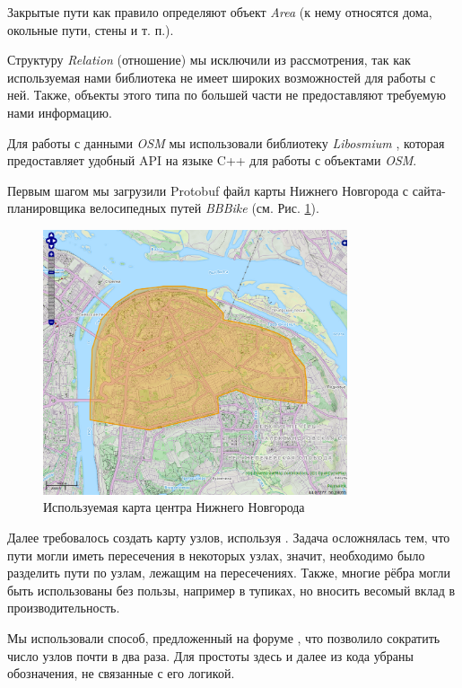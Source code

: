 \documentclass[11pt]{article}
\begin{document}
    	Закрытые пути как правило определяют объект \textit{Area} (к нему относятся дома, окольные пути, стены и т. п.).
    	
    	Структуру \textit{Relation} (отношение) мы исключили из рассмотрения, так как используемая нами библиотека не имеет широких возможностей для работы с ней.
    	Также, объекты этого типа по большей части не предоставляют требуемую нами информацию.
    
	Для работы с данными \textit{OSM} мы использовали библиотеку \textit{Libosmium} \cite{libosm}, которая предоставляет удобный API на языке C++ для работы с объектами \textit{OSM}.
	
	Первым шагом мы загрузили Protobuf файл карты Нижнего Новгорода с сайта-планировщика велосипедных путей \textit{BBBike} \cite{bbbike} (см. Рис. \ref{fig:bbbike}).

	\begin{figure}[ht]
	\centering	
	\includegraphics[width=0.8\textwidth]{pics/bbbike.png}
	\caption{Используемая карта центра Нижнего Новгорода}
	\label{fig:bbbike}
	\end{figure}
	
	Далее требовалось создать карту узлов, используя \cite{libosm}.
	Задача осложнялась тем, что пути могли иметь пересечения в некоторых узлах, значит, необходимо было разделить пути по узлам, лежащим на пересечениях.
	Также, многие рёбра могли быть использованы без пользы, например в тупиках, но вносить весомый вклад в производительность.
	
	Мы использовали способ, предложенный на форуме \cite{forum}, что позволило сократить число узлов почти в два раза.
	Для простоты здесь и далее из кода убраны обозначения, не связанные с его логикой.
	
\end{document}
